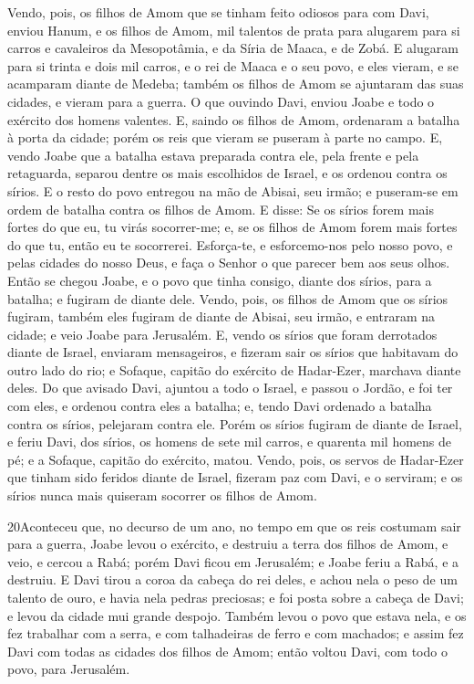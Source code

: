 Vendo, pois, os filhos de Amom que se tinham feito odiosos para
com Davi, enviou Hanum, e os filhos de Amom, mil talentos de prata
para alugarem para si carros e cavaleiros da Mesopotâmia, e da Síria
de Maaca, e de Zobá. E alugaram para si trinta e dois mil
carros, e o rei de Maaca e o seu povo, e eles vieram, e se acamparam
diante de Medeba; também os filhos de Amom se ajuntaram das suas
cidades, e vieram para a guerra. O que ouvindo Davi, enviou
Joabe e todo o exército dos homens valentes. E, saindo os filhos
de Amom, ordenaram a batalha à porta da cidade; porém os reis que
vieram se puseram à parte no campo. E, vendo Joabe que a
batalha estava preparada contra ele, pela frente e pela retaguarda,
separou dentre os mais escolhidos de Israel, e os ordenou contra os
sírios. E o resto do povo entregou na mão de Abisai, seu
irmão; e puseram-se em ordem de batalha contra os filhos de Amom.
E disse: Se os sírios forem mais fortes do que eu, tu virás
socorrer-me; e, se os filhos de Amom forem mais fortes do que tu,
então eu te socorrerei. Esforça-te, e esforcemo-nos pelo
nosso povo, e pelas cidades do nosso Deus, e faça o Senhor o que
parecer bem aos seus olhos. Então se chegou Joabe, e o povo
que tinha consigo, diante dos sírios, para a batalha; e fugiram de
diante dele. Vendo, pois, os filhos de Amom que os sírios
fugiram, também eles fugiram de diante de Abisai, seu irmão, e
entraram na cidade; e veio Joabe para Jerusalém. E, vendo os
sírios que foram derrotados diante de Israel, enviaram mensageiros,
e fizeram sair os sírios que habitavam do outro lado do rio; e
Sofaque, capitão do exército de Hadar-Ezer, marchava diante deles.
Do que avisado Davi, ajuntou a todo o Israel, e passou o
Jordão, e foi ter com eles, e ordenou contra eles a batalha; e,
tendo Davi ordenado a batalha contra os sírios, pelejaram contra
ele. Porém os sírios fugiram de diante de Israel, e feriu
Davi, dos sírios, os homens de sete mil carros, e quarenta mil
homens de pé; e a Sofaque, capitão do exército, matou. Vendo,
pois, os servos de Hadar-Ezer que tinham sido feridos diante de
Israel, fizeram paz com Davi, e o serviram; e os sírios nunca mais
quiseram socorrer os filhos de Amom.

\medskip

\lettrine{20} Aconteceu que, no decurso de um ano, no tempo em
que os reis costumam sair para a guerra, Joabe levou o exército, e
destruiu a terra dos filhos de Amom, e veio, e cercou a Rabá; porém
Davi ficou em Jerusalém; e Joabe feriu a Rabá, e a destruiu. E
Davi tirou a coroa da cabeça do rei deles, e achou nela o peso de um
talento de ouro, e havia nela pedras preciosas; e foi posta sobre a
cabeça de Davi; e levou da cidade mui grande despojo. Também
levou o povo que estava nela, e os fez trabalhar com a serra, e com
talhadeiras de ferro e com machados; e assim fez Davi com todas as
cidades dos filhos de Amom; então voltou Davi, com todo o povo, para
Jerusalém.

